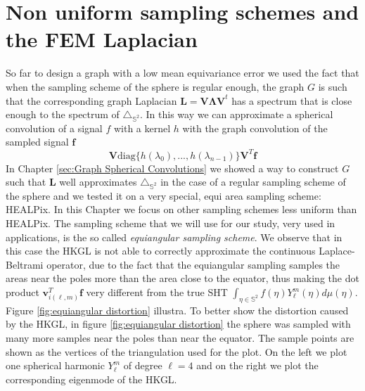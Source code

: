 

\section{Non uniform sampling schemes and the FEM Laplacian}

So far to design a graph with a low mean equivariance error we used the fact that when the sampling scheme of the sphere is regular enough, the graph $G$ is such that the corresponding graph Laplacian $\mathbf {L=V\Lambda V}^t$ has a spectrum that is close enough to the spectrum of $\triangle_{\mathbb S^2}$. In this way we can approximate a spherical convolution of a signal $f$ with a kernel $h$ with the graph convolution of the sampled signal $\mathbf f$
$$
\mathbf V\text{diag}\{h(\lambda_0), ..., h(\lambda_{n-1})\}\mathbf V^T\mathbf f
$$
In Chapter \ref{sec:Graph Spherical Convolutions} we showed a way to construct $G$ such that $\mathbf L$ well approximates $\triangle_{\mathbb S^2}$ in the case of a regular sampling scheme of the sphere and we tested it on a very special, equi area sampling scheme: HEALPix. In this Chapter we focus on other sampling schemes less uniform than HEALPix. The sampling scheme that we will use for our study, very used in applications, is the so called \textit{equiangular sampling scheme}. We observe that in this case the HKGL is not able to correctly approximate the continuous Laplace-Beltrami operator, due to the fact that the equiangular sampling samples the areas near the poles more than the area close to the equator, thus making the dot product $\mathbf v^T_{i(\ell, m)} \mathbf f$ very different from the true SHT $\int_{\eta \in \mathbb S^2}f(\eta)Y_\ell^m(\eta)d\mu(\eta)$. Figure \ref{fig:equiangular distortion} illustra. To better show the distortion caused by the HKGL, in figure \ref{fig:equiangular distortion} the sphere was sampled with many more samples near the poles than near the equator. The sample points are shown as the vertices of the triangulation used for the plot. On the left we plot one spherical harmonic $Y_\ell^m$ of degree $\ell=4$ and on the right we plot the corresponding eigenmode of the HKGL. 
